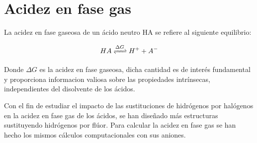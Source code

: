 \begin{comment}También se ha realizado el estudio de estabilidad entre dichos ácidos observando el isómero más estable de cada uno, ver tabla 3.7, se tiene que el ácido más estable es el sulfúrico, seguido del fosfórico y por último, el menos estable de los tres, el ácido carbónico \\

\begin{table}[H]
	\centering
	\begin{tabular}{|c|c|c|c|c|c|}
		\hline
Ácido&$\Delta E$&Ácido&$\Delta E$& Ácido&$\Delta E$\\ \hline
$H_2SO_4$&0,00&$HFSO_4$&0&$HClSO_4$&0\\ \hline
$H_3PO_4$&3,52E+04&$H_2FPO_4$&3,52E+04&$H_2ClPO_4$&3,52E+04\\ \hline
$H_2CO_3$&2,73E+05&$HFCO_3$&2,73E+05&$HClCO_3$&2,73E+05\\ \hline
	\end{tabular}
	\caption{Diferencias de energía en Kcal/mol}
\end{table}
Dicha estabilidad se debe a que la estructura del ácido carbónico es plana (trigonal plana) y por lo tanto más rígida, lo que le proporciona menor estabilidad.\\ Sin embargo, las otras dos estructuras son tetraédricas, en el caso del ácido fosfórico, las distancias P-O son mayores que las distancias S-O, ya que el fósforo es de mayor tamaño que el azufre y menos electronegativo, por consiguiente, distancias O--H mayores, sin posibilidad de formar enlaces de hidrógeno en dicha molécula, mientras que en el ácido sulfúrico si se forma dicho enlace. Ver figura 3.3
\end{comment}

\section{Acidez en fase gas}


La acidez en fase gaseosa de un ácido neutro HA se refiere al siguiente equilibrio:

$$HA\xrightleftharpoons{\Delta G} H^+ + A^-$$

Donde $\Delta G$ es la acidez en fase gaseosa, dicha cantidad es de interés fundamental y proporciona informacion valiosa sobre las propiedades intrínsecas, independientes del disolvente de los ácidos. \cite{quimica3}

Con el fin de estudiar el impacto de las sustituciones de hidrógenos por halógenos en la acidez en fase gas de los ácidos, se han diseñado más estructuras sustituyendo hidrógenos por flúor. Para calcular la acidez en fase gas se han hecho los mismos cálculos computacionales con sus aniones.


